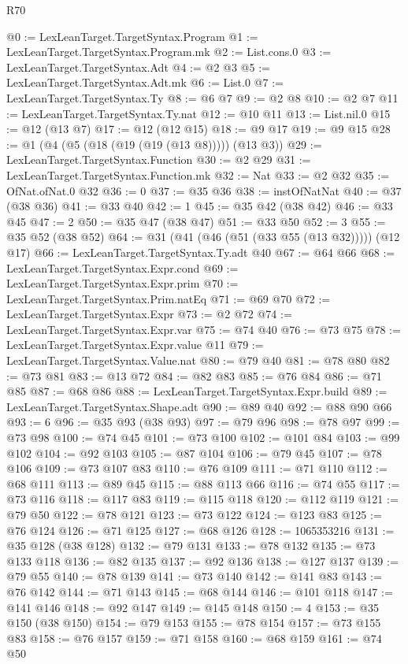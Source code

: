\begin{lexlean}{R70}
\begin{coremodule}
@0 := LexLeanTarget.TargetSyntax.Program
@1 := LexLeanTarget.TargetSyntax.Program.mk
@2 := List.cons.{0}
@3 := LexLeanTarget.TargetSyntax.Adt
@4 := @2 @3
@5 := LexLeanTarget.TargetSyntax.Adt.mk
@6 := List.{0}
@7 := LexLeanTarget.TargetSyntax.Ty
@8 := @6 @7
@9 := @2 @8
@10 := @2 @7
@11 := LexLeanTarget.TargetSyntax.Ty.nat
@12 := @10 @11
@13 := List.nil.{0}
@15 := @12 (@13 @7)
@17 := @12 (@12 @15)
@18 := @9 @17
@19 := @9 @15
@28 := @1 (@4 (@5 (@18 (@19 (@19 (@13 @8))))) (@13 @3))
@29 := LexLeanTarget.TargetSyntax.Function
@30 := @2 @29
@31 := LexLeanTarget.TargetSyntax.Function.mk
@32 := Nat
@33 := @2 @32
@35 := OfNat.ofNat.{0} @32
@36 := 0
@37 := @35 @36
@38 := instOfNatNat
@40 := @37 (@38 @36)
@41 := @33 @40
@42 := 1
@45 := @35 @42 (@38 @42)
@46 := @33 @45
@47 := 2
@50 := @35 @47 (@38 @47)
@51 := @33 @50
@52 := 3
@55 := @35 @52 (@38 @52)
@64 := @31 (@41 (@46 (@51 (@33 @55 (@13 @32))))) (@12 @17)
@66 := LexLeanTarget.TargetSyntax.Ty.adt @40
@67 := @64 @66
@68 := LexLeanTarget.TargetSyntax.Expr.cond
@69 := LexLeanTarget.TargetSyntax.Expr.prim
@70 := LexLeanTarget.TargetSyntax.Prim.natEq
@71 := @69 @70
@72 := LexLeanTarget.TargetSyntax.Expr
@73 := @2 @72
@74 := LexLeanTarget.TargetSyntax.Expr.var
@75 := @74 @40
@76 := @73 @75
@78 := LexLeanTarget.TargetSyntax.Expr.value @11
@79 := LexLeanTarget.TargetSyntax.Value.nat
@80 := @79 @40
@81 := @78 @80
@82 := @73 @81
@83 := @13 @72
@84 := @82 @83
@85 := @76 @84
@86 := @71 @85
@87 := @68 @86
@88 := LexLeanTarget.TargetSyntax.Expr.build
@89 := LexLeanTarget.TargetSyntax.Shape.adt
@90 := @89 @40
@92 := @88 @90 @66
@93 := 6
@96 := @35 @93 (@38 @93)
@97 := @79 @96
@98 := @78 @97
@99 := @73 @98
@100 := @74 @45
@101 := @73 @100
@102 := @101 @84
@103 := @99 @102
@104 := @92 @103
@105 := @87 @104
@106 := @79 @45
@107 := @78 @106
@109 := @73 @107 @83
@110 := @76 @109
@111 := @71 @110
@112 := @68 @111
@113 := @89 @45
@115 := @88 @113 @66
@116 := @74 @55
@117 := @73 @116
@118 := @117 @83
@119 := @115 @118
@120 := @112 @119
@121 := @79 @50
@122 := @78 @121
@123 := @73 @122
@124 := @123 @83
@125 := @76 @124
@126 := @71 @125
@127 := @68 @126
@128 := 1065353216
@131 := @35 @128 (@38 @128)
@132 := @79 @131
@133 := @78 @132
@135 := @73 @133 @118
@136 := @82 @135
@137 := @92 @136
@138 := @127 @137
@139 := @79 @55
@140 := @78 @139
@141 := @73 @140
@142 := @141 @83
@143 := @76 @142
@144 := @71 @143
@145 := @68 @144
@146 := @101 @118
@147 := @141 @146
@148 := @92 @147
@149 := @145 @148
@150 := 4
@153 := @35 @150 (@38 @150)
@154 := @79 @153
@155 := @78 @154
@157 := @73 @155 @83
@158 := @76 @157
@159 := @71 @158
@160 := @68 @159
@161 := @74 @50

\end{coremodule}
\end{lexlean}
